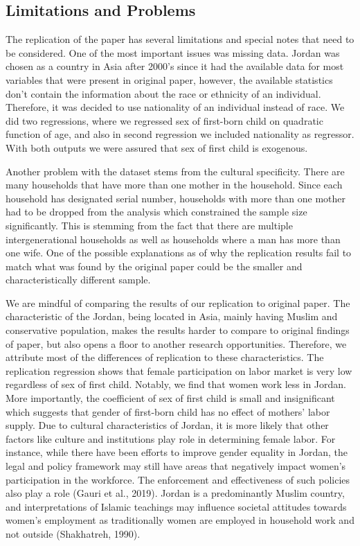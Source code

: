 \documentclass[12pt,draft,a4paper]{article}
\begin{document}
\subsection{Limitations and Problems}
The replication of the paper has several limitations and special notes that need to be considered.
One of the most important issues was missing data.
Jordan was chosen as a country in Asia after 2000's since it had the available data for most variables that were present in original paper, however, the available statistics don't contain the information about the race or ethnicity of an individual.
Therefore, it was decided to use nationality of an individual instead of race.
We did two regressions, where we regressed sex of first-born child on quadratic function of age, and also in second regression we included nationality as regressor. With both outputs we were assured that sex of first child is exogenous.

Another problem with the dataset stems from the cultural specificity. There are many households that have more than one mother in the household.
Since each household has designated serial number, households with more than one mother had to be dropped from the analysis which constrained the sample size significantly.
This is stemming from the fact that there are multiple intergenerational households as well as households where a man has more than one wife.
One of the possible explanations as of why the replication results fail to match what was found by the original paper could be the smaller and characteristically different sample.

We are mindful of comparing the results of our replication to original paper. 
The characteristic of the Jordan, being located in Asia, mainly having Muslim and conservative population, makes the results harder to compare to original findings of paper, but also opens a floor to another research opportunities.
Therefore, we attribute most of the differences of replication to these characteristics. 
The replication regression shows that female participation on labor market is very low regardless of sex of first child. 
Notably, we find that women work less in Jordan.
More importantly, the coefficient of sex of first child is small and insignificant which suggests that gender of first-born child has no effect of mothers' labor supply.
Due to cultural characteristics of Jordan, it is more likely that other factors like culture and institutions play role in determining female labor.
For instance, while there have been efforts to improve gender equality in Jordan, the legal and policy framework may still have areas that negatively impact women's participation in the workforce. 
The enforcement and effectiveness of such policies also play a role (Gauri et al., 2019).
Jordan is a predominantly Muslim country, and interpretations of Islamic teachings may influence societal attitudes towards women's employment as traditionally women are employed in household work and not outside (Shakhatreh, 1990). 
\end{document}
